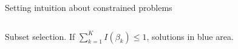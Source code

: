 \documentclass[mathserif, handout, aspectratio=169]{beamer}
\begin{document}
\begin{frame}{Setting intuition about constrained problems}
\begin{columns}
\pause
{}
\begin{center}
Subset selection.  If $\sum_{k=1}^K I(\beta_k) \le 1$, solutions in blue area.
\end{center}


\end{columns}
\end{frame}
\end{document}
